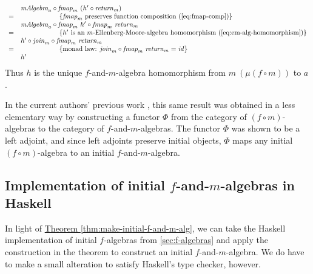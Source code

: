 \documentclass{jfp1}
\newcommand{\eqAnnotation}[1]{\hspace{2cm}\left\{\textrm{#1}\right\}}
\newcommand{\thmref}[1]{\hyperref[#1]{Theorem \ref*{#1}}}
\begin{document}
\begin{proof*}
\begin{enumerate}
\begin{displaymath}
\begin{array}{cl}
        &\mathit{mAlgebra}_a \circ \mathit{fmap}_m~(h' \circ \mathit{return}_m) \\
        =&\eqAnnotation{$\mathit{fmap}_m$ preserves function composition (\autoref{eq:fmap-comp})} \\
        &\mathit{mAlgebra}_a \circ \mathit{fmap}_m~{h'} \circ \mathit{fmap}_m~\mathit{return}_m \\
        =&\eqAnnotation{$h'$ is an $m$-Eilenberg-Moore-algebra homomorphism (\autoref{eq:em-alg-homomorphism})} \\
        &h' \circ \mathit{join}_m \circ \mathit{fmap}_m~\mathit{return}_m \\
        =&\eqAnnotation{monad law: $\mathit{join}_m \circ \mathit{fmap}_m~\mathit{return}_m = \mathit{id}$} \\
        &h'
      \end{array}
    \end{displaymath}
    Thus $h$ is the unique $f$-and-$m$-algebra homomorphism from
    $m~(\mu (f \circ m))$ to $a$. \mathproofbox
  \end{enumerate}
\end{proof*}

In the current authors' previous work \cite{atkey12fibrational}, this
same result was obtained in a less elementary way by constructing a
functor $\Phi$ from the category of $(f \circ m)$-algebras to the
category of $f$-and-$m$-algebras. The functor $\Phi$ was shown to be a
left adjoint, and since left adjoints preserve initial objects, $\Phi$
maps any initial $(f \circ m)$-algebra to an initial
$f$-and-$m$-algebra.


\subsection{Implementation of initial $f$-and-$m$-algebras in Haskell}
\label{sec:f-and-m-alg-impl}

\newcommand{\fcompose}{\mathop{\mathord:\circ\mathord:}}

In light of \thmref{thm:make-initial-f-and-m-alg}, we can take the
Haskell implementation of initial $f$-algebras from
\autoref{sec:f-algebras} and apply the construction in the
theorem to construct an initial $f$-and-$m$-algebra. We do have to
make a small alteration to satisfy Haskell's type checker, however.
\end{document}
